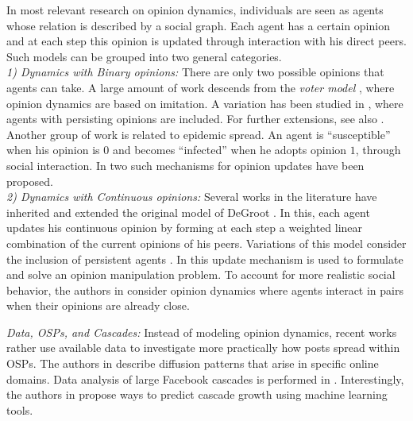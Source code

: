 \documentclass[10pt, conference, letterpaper]{IEEEtran}
\begin{document}
In most relevant research on opinion dynamics, individuals are seen as agents whose relation is described by a social graph. Each agent has a certain opinion and at each step this opinion is updated through interaction with his direct peers. Such models can be grouped into two general categories.\\
\textit{1) Dynamics with Binary opinions:} There are only two possible opinions that agents can take.  A large amount of work descends from the \textit{voter model} \cite{HoLi75}, where opinion dynamics are based on imitation. %
A variation has been studied in \cite{YOASS}, where agents with persisting opinions are included. For further extensions, see also \cite{HayelINFO18}. %
Another group of work is related to epidemic spread. An agent is ``susceptible'' when his opinion is $0$ and becomes ``infected'' when he adopts opinion $1$, through social interaction. In \cite{Kempe03} two such mechanisms for opinion updates have been proposed. %
\\
\textit{2) Dynamics with Continuous opinions:} Several works in the literature have inherited and extended the original model of DeGroot \cite{DeGroot}. In this, each agent updates his continuous opinion by forming at each step a weighted linear combination of the current opinions of his peers. Variations of this model consider the inclusion of persistent agents \cite{Emily18}. In \cite{Silva17} this update mechanism is used to formulate and solve an opinion manipulation problem. %
To account for more realistic social behavior, the authors in \cite{BaccINFO15} consider opinion dynamics where agents interact in pairs when their opinions are already close.



\textit{Data, OSPs, and Cascades:} Instead of modeling opinion dynamics, recent works rather use available data to investigate more practically how posts spread within OSPs. The authors in \cite{EC2012} describe diffusion patterns that arise in specific online domains. Data analysis of large Facebook cascades is performed in \cite{Adamic2013}. Interestingly, the authors in \cite{LescovecPredict} propose ways to predict cascade growth using machine learning tools.
\end{document}
